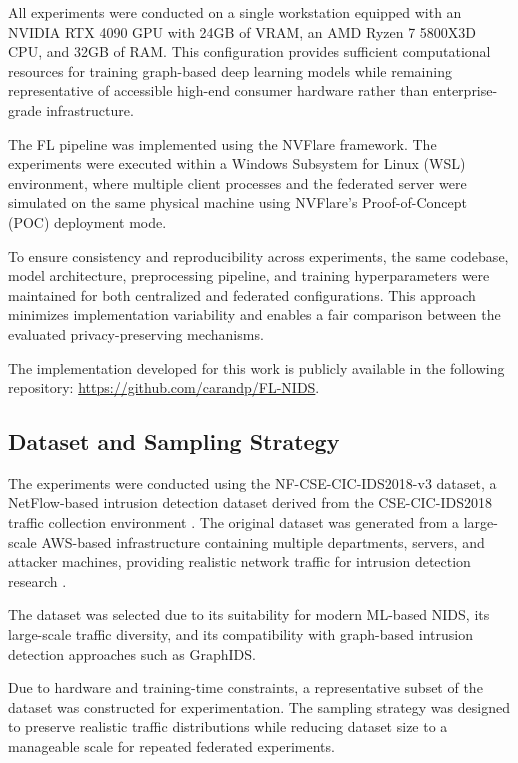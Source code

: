 \documentclass[conference]{IEEEtran}
\begin{document}
All experiments were conducted on a single workstation equipped with an NVIDIA RTX 4090 GPU with 24GB of VRAM, an AMD Ryzen 7 5800X3D CPU, and 32GB of RAM. This configuration provides sufficient computational resources for training graph-based deep learning models while remaining representative of accessible high-end consumer hardware rather than enterprise-grade infrastructure.

The FL pipeline was implemented using the NVFlare framework. The experiments were executed within a Windows Subsystem for Linux (WSL) environment, where multiple client processes and the federated server were simulated on the same physical machine using NVFlare's Proof-of-Concept (POC) deployment mode.

To ensure consistency and reproducibility across experiments, the same codebase, model architecture, preprocessing pipeline, and training hyperparameters were maintained for both centralized and federated configurations. This approach minimizes implementation variability and enables a fair comparison between the evaluated privacy-preserving mechanisms.

The implementation developed for this work is publicly available in the following repository: \url{https://github.com/carandp/FL-NIDS}.

\subsection{Dataset and Sampling Strategy}
\label{subsec:dataset_sampling}

The experiments were conducted using the NF-CSE-CIC-IDS2018-v3 dataset, a NetFlow-based intrusion detection dataset derived from the CSE-CIC-IDS2018 traffic collection environment \cite{luay2026}. The original dataset was generated from a large-scale AWS-based infrastructure containing multiple departments, servers, and attacker machines, providing realistic network traffic for intrusion detection research \cite{csecicids2018}. 

The dataset was selected due to its suitability for modern ML-based NIDS, its large-scale traffic diversity, and its compatibility with graph-based intrusion detection approaches such as GraphIDS.

Due to hardware and training-time constraints, a representative subset of the dataset was constructed for experimentation. The sampling strategy was designed to preserve realistic traffic distributions while reducing dataset size to a manageable scale for repeated federated experiments.
\end{document}
